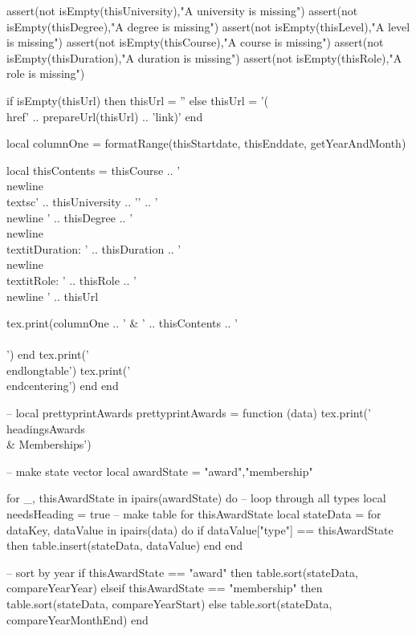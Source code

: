 \documentclass[letterpaper, 10pt]{article}
\newcommand{\headings}[1]{\section*{#1} \hrule \vspace{10pt}}
\begin{document}
\begin{luacode}
				assert(not isEmpty(thisUniversity),"A university is missing")
				assert(not isEmpty(thisDegree),"A degree is missing")
				assert(not isEmpty(thisLevel),"A level is missing")
				assert(not isEmpty(thisCourse),"A course is missing")
				assert(not isEmpty(thisDuration),"A duration is missing")
				assert(not isEmpty(thisRole),"A role is missing")

				if isEmpty(thisUrl) then
					thisUrl = ''
				else
					thisUrl = '(\\href{' .. prepareUrl(thisUrl) .. '}{link})'
				end

				local columnOne = formatRange(thisStartdate, thisEnddate, getYearAndMonth)

				local thisContents = thisCourse ..
									'\\newline\\textsc{' .. thisUniversity .. '}' ..
									'\\newline ' .. thisDegree ..
									'\\newline\\textit{Duration:} ' .. thisDuration ..
									'\\newline\\textit{Role:} ' .. thisRole ..
									'\\newline ' .. thisUrl

				tex.print(columnOne .. ' & ' .. thisContents .. ' \\\\')
			end
			tex.print('\\end{longtable}')
			tex.print('\\end{centering}')
		end
	end

	-- local prettyprintAwards
	prettyprintAwards = function (data)
		tex.print('\\headings{Awards \\& Memberships}')

		-- make state vector
		local awardState = {"award","membership"}

		for _, thisAwardState in ipairs(awardState) do 											-- loop through all types
			local needsHeading = true
			-- make table for thisAwardState
			local stateData = {}
			for dataKey, dataValue in ipairs(data) do
				if dataValue["type"] == thisAwardState then
					table.insert(stateData, dataValue)
				end
			end

			-- sort by year
			if thisAwardState == "award" then
				table.sort(stateData, compareYearYear)
			elseif thisAwardState == "membership" then
				table.sort(stateData, compareYearStart)
			else
				table.sort(stateData, compareYearMonthEnd)
			end


\end{luacode}
\end{document}
